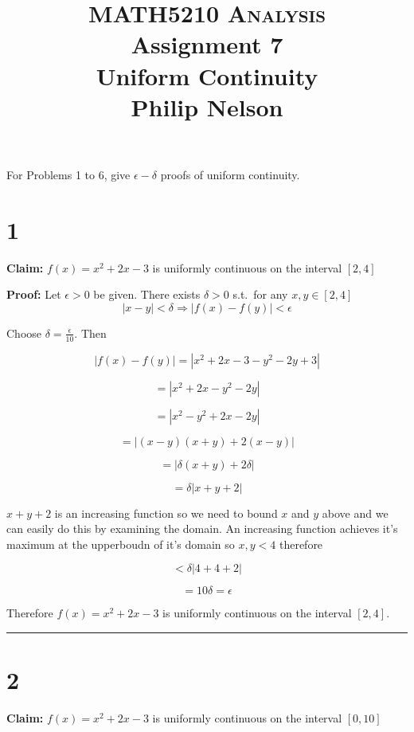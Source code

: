 \documentclass[10pt,letterpaper]{article}
\newcommand\qedsym{\hfill \rule{2mm}{2mm}}
\begin{document}
\title{MATH5210 \textsc{Analysis}
  \\ Assignment 7
  \\ Uniform Continuity
  \\ Philip Nelson
}

\date{}

\maketitle
For Problems 1 to 6, give $\epsilon - \delta$ proofs of uniform continuity.
\section*{1}

\textbf{Claim:} $f(x) = x^2 + 2x -3$ is uniformly continuous on the interval $[2,4]$

\medskip

\textbf{Proof:} Let $\epsilon > 0$ be given. There exists $\delta > 0$ s.t.\ for any $x, y \in [2,4]$ \[|x-y| < \delta \Rightarrow |f(x) - f(y)| < \epsilon\]

Choose $\delta = \frac{\epsilon}{10}$. Then

\[|f(x)-f(y)| = |x^2 + 2x - 3 - y^2 - 2y + 3|\]

\[= |x^2 + 2x - y^2 - 2y|\]

\[= |x^2 - y^2 + 2x - 2y|\]

\[= |(x-y)(x+y) + 2(x-y)|\]

\[= |\delta(x+y) + 2\delta|\]

\[= \delta|x + y + 2|\]

$x + y + 2$ is an increasing function so we need to bound $x$ and $y$ above and we can easily do this by examining the domain. An increasing function achieves it's maximum at the upperboudn of it's domain so $x,y < 4$ therefore

\[<\delta|4+4+2|\]

\[=10\delta = \epsilon\]

Therefore $f(x) = x^2 + 2x -3$ is uniformly continuous on the interval $[2,4]$.

\qedsym

\section*{2}

\textbf{Claim:} $f(x) = x^2 + 2x -3$ is uniformly continuous on the interval $[0,10]$

\medskip
\end{document}

